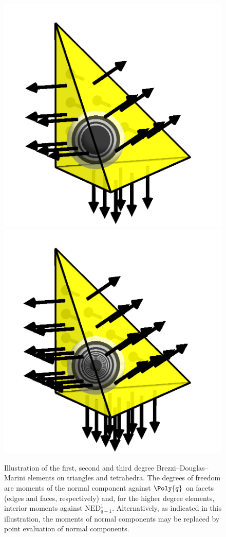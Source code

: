 \begin{figure}
  \includegraphics[width=\threefigs]{chapters/kirby-6/png/BDM2_3d.png}
  \includegraphics[width=\threefigs]{chapters/kirby-6/png/BDM3_3d.png}
  \caption{Illustration of the first, second and third degree
    Brezzi--Douglas--Marini elements on triangles and tetrahedra.
    The degrees of freedom are moments of the normal component
    against $\Poly{q}$ on facets (edges and faces, respectively)
    and, for the higher degree elements, interior moments against
    $\mathrm{NED}^1_{q-1}$. Alternatively, as indicated in this
    illustration, the moments of normal components may be replaced
    by point evaluation of normal components.}
  \label{kirby-6:fig:bdm}
\end{figure}

